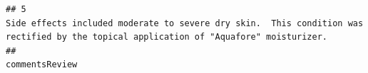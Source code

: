 \documentclass[spanish,]{article}
\begin{document}
\begin{verbatim}
## 5                                                                                                                                                                                                                                                                                                                                                                                                                                                                                                                                                                                                                                                                                                                                                                                                                                                                      Side effects included moderate to severe dry skin.  This condition was rectified by the topical application of "Aquafore" moisturizer.
##                                                                                                                                                                                                                                                                                                                                                                                                                                                                                                                                                                                                                                                                                                                                                                                                                                                                                                                                                                                                                                                                                                                                                                                                                                      commentsReview

\end{verbatim}
\end{document}
